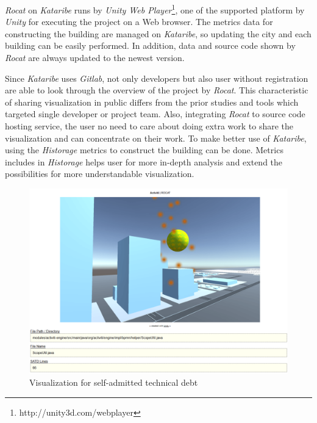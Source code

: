 \documentclass[conference]{IEEEtran}
\begin{document}
\textit{Rocat} on \textit{Kataribe} runs by \textit{Unity Web Player}\footnote{http://unity3d.com/webplayer}, one of the supported platform by \textit{Unity} for executing the project on a Web browser.
The metrics data for constructing the building are managed on \textit{Kataribe}, so updating the city and each building can be easily performed.
In addition, data and source code shown by \textit{Rocat} are always updated to the newest version.

Since \textit{Kataribe} uses \textit{Gitlab}, not only developers but also user without registration are able to look through the overview of the project by \textit{Rocat}.
This characteristic of sharing visualization in public differs from the prior studies and tools which targeted single developer or project team.
Also, integrating \textit{Rocat} to source code hosting service, the user no need to care about doing extra work to share the visualization and can concentrate on their work.
To make better use of \textit{Kataribe}, using the \textit{Historage} metrics to construct the building can be done.
Metrics includes in \textit{Historage} helps user for more in-depth analysis and extend the possibilities for more understandable visualization.


\begin{figure}[tb]
\centering
\includegraphics[width=\linewidth]{satd.pdf}
\caption{Visualization for self-admitted technical debt}
\label{figure:SATD}
\end{figure}
\end{document}
